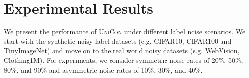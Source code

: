 \documentclass[10pt,twocolumn,letterpaper]{article}
\begin{document}
\begin{table}[t]
\vspace{-2.5mm}
\centering
\medskip{}
\vspace{-1mm}
\caption{Experimental results on CIFAR10 and CIFAR100 with asymmetric noise. \textsc{UniCon} sees consistent improvement for CIFAR100 dataset under different asymmetric noise settings. $(*)$ indicates that we run the algorithm.}
\label{tab:asymmetry_cifar10_100}
\vspace{-2mm}
\end{table}

\section{Experimental Results}
We present the performance of \textsc{UniCon} under different label noise scenarios. We start with the synthetic noisy label datasets (e.g. CIFAR10, CIFAR100 and TinyImageNet) and move on to the real world noisy datasets (e.g. WebVision, Clothing1M). For experiments, we consider symmetric noise rates of 20\%, 50\%, 80\%, and 90\% and asymmetric noise rates of 10\%, 30\%, and 40\%. 
\end{document}
